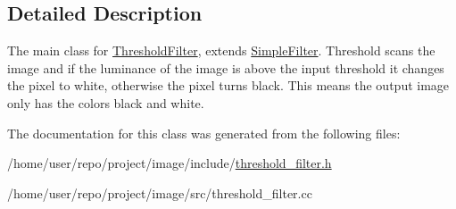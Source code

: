 \subsection{Detailed Description}
The main class for \hyperlink{classThresholdFilter}{Threshold\+Filter}, extends \hyperlink{classSimpleFilter}{Simple\+Filter}. Threshold scans the image and if the luminance of the image is above the input threshold it changes the pixel to white, otherwise the pixel turns black. This means the output image only has the colors black and white. 

The documentation for this class was generated from the following files\+:\begin{DoxyCompactItemize}
\item 
/home/user/repo/project/image/include/\hyperlink{threshold__filter_8h}{threshold\+\_\+filter.\+h}\item 
/home/user/repo/project/image/src/threshold\+\_\+filter.\+cc\end{DoxyCompactItemize}
